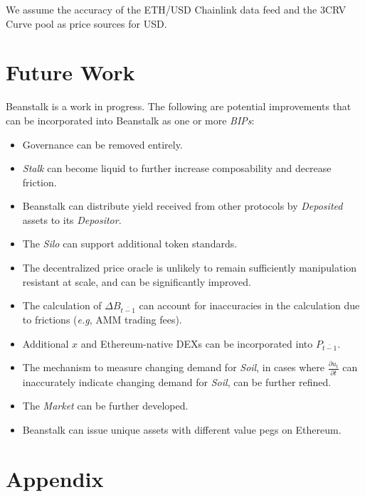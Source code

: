 \documentclass[tikz]{article}
\newcommand{\term}[1]{\textsl{#1}}
\begin{document}
We assume the accuracy of the ETH/USD Chainlink data feed and the 3CRV Curve pool as price sources for USD.

\newpage

\section{Future Work}
Beanstalk is a work in progress. The following are potential improvements that can be incorporated into Beanstalk as one or more \term{BIPs}:

\begin{itemize}
    \item Governance can be removed entirely.
    \item \term{Stalk} can become liquid to further increase composability and decrease friction. 
    \item Beanstalk can distribute yield received from other protocols by \term{Deposited} assets to its \term{Depositor}.
    \item The \term{Silo} can support additional token standards.
    \item The decentralized price oracle is unlikely to remain sufficiently manipulation resistant at scale, and can be significantly improved. 
    \item The calculation of \hyperlink{ht50}{$\Delta B_{\overline{t-1}}$} can account for inaccuracies in the calculation due to frictions (\term{e.g}, AMM trading fees).
    \item Additional \hyperlink{ht223}{$x$} and Ethereum-native DEXs can be incorporated into \hyperlink{ht139}{$P_{\overline{t-1}}$}.
    \item The mechanism to measure changing demand for \term{Soil}, in cases where \hyperlink{ht63}{$\frac{\partial u_t}{\partial t}$} can inaccurately indicate changing demand for \term{Soil}, can be further refined.
    \item The \term{Market} can be further developed.
    \item Beanstalk can issue unique assets with different value pegs on Ethereum.
\end{itemize}

\newpage
\section{Appendix}

\newpage
\end{document}
